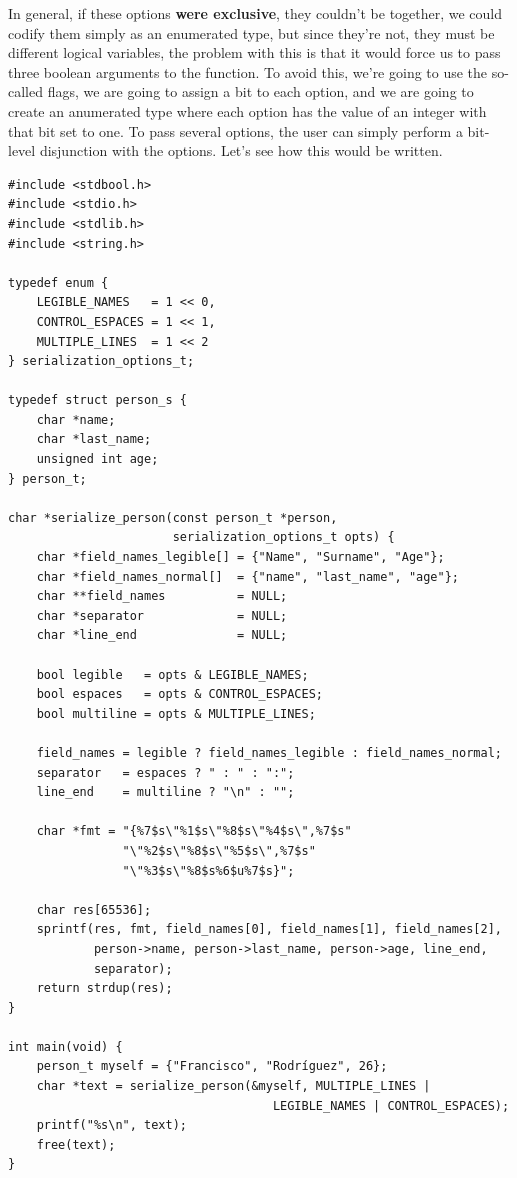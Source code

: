 \documentclass[a4paper]{article}
\begin{document}
In general, if these options \textbf{were exclusive}, they couldn't be together,
we could codify them simply as an enumerated type, but since they're not, they
must be different logical variables, the problem with this is that it would
force us to pass three boolean arguments to the function. To avoid this, we're
going to use the so-called flags, we are going to assign a bit to each option,
and we are going to create an anumerated type where each option has the value
of an integer with that bit set to one. To pass several options, the user
can simply perform a bit-level disjunction with the options. Let's see how this
would be written.

\noindent
\begin{minipage}[H]{\linewidth}
\mbox{}
\begin{lstlisting}[style=C, label={lst:options},
caption={Implementation of flags with bit-level operations}]
#include <stdbool.h>
#include <stdio.h>
#include <stdlib.h>
#include <string.h>

typedef enum {
    LEGIBLE_NAMES   = 1 << 0,
    CONTROL_ESPACES = 1 << 1,
    MULTIPLE_LINES  = 1 << 2
} serialization_options_t;

typedef struct person_s {
    char *name;
    char *last_name;
    unsigned int age;
} person_t;

char *serialize_person(const person_t *person,
                       serialization_options_t opts) {
    char *field_names_legible[] = {"Name", "Surname", "Age"};
    char *field_names_normal[]  = {"name", "last_name", "age"};
    char **field_names          = NULL;
    char *separator             = NULL;
    char *line_end              = NULL;

    bool legible   = opts & LEGIBLE_NAMES;
    bool espaces   = opts & CONTROL_ESPACES;
    bool multiline = opts & MULTIPLE_LINES;

    field_names = legible ? field_names_legible : field_names_normal;
    separator   = espaces ? " : " : ":";
    line_end    = multiline ? "\n" : "";

    char *fmt = "{%7$s\"%1$s\"%8$s\"%4$s\",%7$s"
                "\"%2$s\"%8$s\"%5$s\",%7$s"
                "\"%3$s\"%8$s%6$u%7$s}";

    char res[65536];
    sprintf(res, fmt, field_names[0], field_names[1], field_names[2],
            person->name, person->last_name, person->age, line_end,
            separator);
    return strdup(res);
}

int main(void) {
    person_t myself = {"Francisco", "Rodríguez", 26};
    char *text = serialize_person(&myself, MULTIPLE_LINES |
                                     LEGIBLE_NAMES | CONTROL_ESPACES);
    printf("%s\n", text);
    free(text);
}
\end{lstlisting}
\end{minipage}
\end{document}
